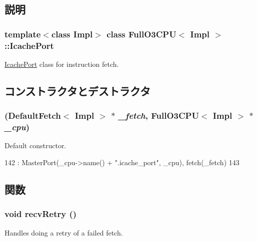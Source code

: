 \subsection{説明}
\subsubsection*{template$<$class Impl$>$ class FullO3CPU$<$ Impl $>$::IcachePort}

\hyperlink{classFullO3CPU_1_1IcachePort}{IcachePort} class for instruction fetch. 

\subsection{コンストラクタとデストラクタ}
\hypertarget{classFullO3CPU_1_1IcachePort_ab905fcd26bb5e01f16795ab04c55f159}{
\subsubsection[{IcachePort}]{ ({\bf DefaultFetch}$<$ Impl $>$ $\ast$ {\em \_\-fetch}, \/  {\bf FullO3CPU}$<$ Impl $>$ $\ast$ {\em \_\-cpu})}}
\label{classFullO3CPU_1_1IcachePort_ab905fcd26bb5e01f16795ab04c55f159}
Default constructor. 


\begin{DoxyCode}
142             : MasterPort(_cpu->name() + ".icache_port", _cpu), fetch(_fetch)
143         { }
\end{DoxyCode}


\subsection{関数}
\hypertarget{classFullO3CPU_1_1IcachePort_a29cb5a4f98063ce6e9210eacbdb35298}{
\subsubsection[{recvRetry}]{\setlength{\rightskip}{0pt plus 5cm}void recvRetry ()}}
\label{classFullO3CPU_1_1IcachePort_a29cb5a4f98063ce6e9210eacbdb35298}
Handles doing a retry of a failed fetch. 

